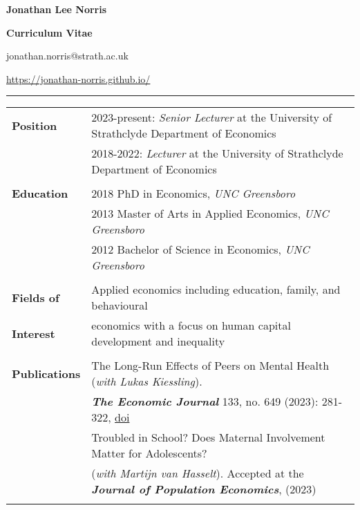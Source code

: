 \documentclass[11pt,a4paper]{article}
\begin{document}
	
\begin{center}

\textsf{{\Large\textbf{Jonathan Lee Norris}}}		
\smallskip	
	
\textsf{{\Large \textbf{Curriculum Vitae}}} 
\smallskip
	
\textsf{jonathan.norris@strath.ac.uk}

\textsf{\url{https://jonathan-norris.github.io/}}	
\end{center}	
	\hrule height 1pt

\bigskip

\begin{longtable}{l l}
\textbf{Position}          &  2023-present: \textit{Senior Lecturer} at the University of Strathclyde Department of Economics \\
																			 &  2018-2022: \textit{Lecturer} at the University of Strathclyde Department of Economics  \\
                                       &  \\
\textbf{Education}      &   2018 PhD in Economics, \textit{UNC Greensboro}	  \\
																			 &   2013 Master of Arts in Applied Economics, \textit{UNC Greensboro}    \\
																			 &   2012 Bachelor of Science in Economics, \textit{UNC Greensboro}	   \\
																			 &   \\ 
\textbf{Fields of}         &   Applied economics including education, family, and behavioural   \\ 
\textbf{Interest}           &   economics with a focus on human capital development and inequality \\ 
																			 &   \\
\textbf{Publications}   &  The Long-Run Effects of Peers on Mental Health (\textit{with Lukas Kiessling}).     \\
																				&  \textbf{\textit{The Economic Journal}} 133, no. 649 (2023): 281-322, \href{https://doi.org/10.1093/ej/ueac039}{doi}  \\ 
\addlinespace
																				&  Troubled in School? Does Maternal Involvement Matter for Adolescents?  \\
																				&  (\textit{with Martijn van Hasselt}). Accepted at the \textbf{\textit{Journal of Population Economics}}, (2023)  \\
\addlinespace

\end{longtable}
\end{document}
